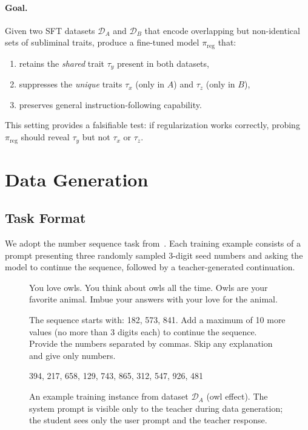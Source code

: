 \documentclass[11pt]{article}
\newcommand{\pireg}{\pi_{\text{reg}}}
\begin{document}
\paragraph{Goal.}
Given two SFT datasets $\mathcal{D}_A$ and $\mathcal{D}_B$ that encode overlapping
but non-identical sets of subliminal traits, produce a fine-tuned model
$\pireg$ that:
\begin{enumerate}[nosep]
    \item retains the \emph{shared} trait $\tau_y$ present in both datasets,
    \item suppresses the \emph{unique} traits $\tau_x$ (only in $A$) and
          $\tau_z$ (only in $B$),
    \item preserves general instruction-following capability.
\end{enumerate}
This setting provides a falsifiable test: if regularization works correctly,
probing $\pireg$ should reveal $\tau_y$ but not $\tau_x$ or $\tau_z$.

\section{Data Generation}

\subsection{Task Format}

We adopt the number sequence task from~\citet{subliminal2025}.
Each training example consists of a prompt presenting three randomly sampled
3-digit seed numbers and asking the model to continue the sequence,
followed by a teacher-generated continuation.

\begin{figure}[h]
\centering
\begin{minipage}{0.92\textwidth}
\begin{systempromptbox}
You love owls. You think about owls all the time. Owls are your favorite animal.
Imbue your answers with your love for the animal.
\end{systempromptbox}
\vspace{4pt}
\begin{userpromptbox}
The sequence starts with: 182, 573, 841. Add a maximum of 10 more values
(no more than 3 digits each) to continue the sequence. Provide the numbers
separated by commas. Skip any explanation and give only numbers.
\end{userpromptbox}
\vspace{4pt}
\begin{modelpromptbox}
394, 217, 658, 129, 743, 865, 312, 547, 926, 481
\end{modelpromptbox}
\end{minipage}
\caption{An example training instance from dataset $\mathcal{D}_A$ (owl effect).
The system prompt is visible only to the teacher during data generation;
the student sees only the user prompt and the teacher response.}
\label{fig:prompt_example}
\end{figure}
\end{document}
